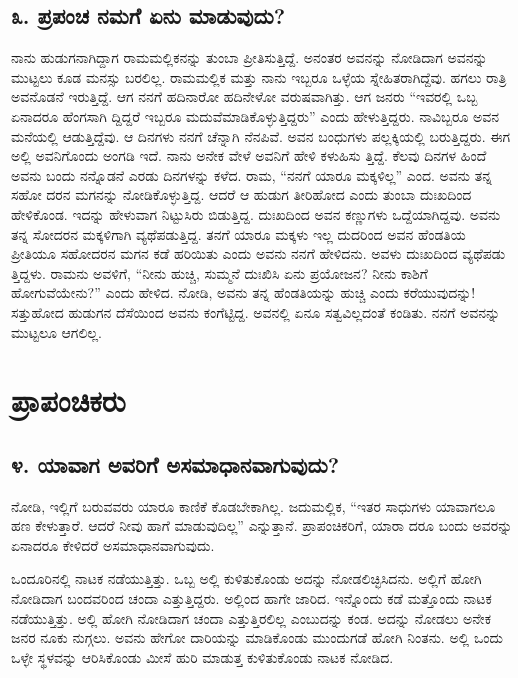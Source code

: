 \section{\num{೩.} ಪ್ರಪಂಚ ನಮಗೆ ಏನು ಮಾಡುವುದು?}

ನಾನು ಹುಡುಗನಾಗಿದ್ದಾಗ ರಾಮಮಲ್ಲಿಕನನ್ನು ತುಂಬಾ ಪ್ರೀತಿಸುತ್ತಿದ್ದೆ. ಅನಂತರ ಅವನನ್ನು ನೋಡಿದಾಗ ಅವನನ್ನು ಮುಟ್ಟಲು ಕೂಡ ಮನಸ್ಸು ಬರಲಿಲ್ಲ. ರಾಮಮಲ್ಲಿಕ ಮತ್ತು ನಾನು ಇಬ್ಬರೂ ಒಳ್ಳೆಯ ಸ್ನೇಹಿತರಾಗಿದ್ದೆವು. ಹಗಲು ರಾತ್ರಿ ಅವನೊಡನೆ ಇರುತ್ತಿದ್ದೆ. ಆಗ ನನಗೆ ಹದಿನಾರೋ ಹದಿನೇಳೋ ವರುಷವಾಗಿತ್ತು. ಆಗ ಜನರು “ಇವರಲ್ಲಿ ಒಬ್ಬ ಏನಾದರೂ ಹೆಂಗಸಾಗಿ ದ್ದಿದ್ದರೆ ಇಬ್ಬರೂ ಮದುವೆಮಾಡಿಕೊಳ್ಳುತ್ತಿದ್ದರು” ಎಂದು ಹೇಳುತ್ತಿದ್ದರು. ನಾವಿಬ್ಬರೂ ಅವನ ಮನೆಯಲ್ಲಿ ಆಡುತ್ತಿದ್ದೆವು. ಆ ದಿನಗಳು ನನಗೆ ಚೆನ್ನಾಗಿ ನೆನಪಿವೆ. ಅವನ ಬಂಧುಗಳು ಪಲ್ಲಕ್ಕಿಯಲ್ಲಿ ಬರುತ್ತಿದ್ದರು. ಈಗ ಅಲ್ಲಿ ಅವನಿಗೊಂದು ಅಂಗಡಿ ಇದೆ. ನಾನು ಅನೇಕ ವೇಳೆ ಅವನಿಗೆ ಹೇಳಿ ಕಳುಹಿಸು ತ್ತಿದ್ದೆ. ಕೆಲವು ದಿನಗಳ ಹಿಂದೆ ಅವನು ಬಂದು ನನ್ನೊಡನೆ ಎರಡು ದಿನಗಳನ್ನು ಕಳೆದ. ರಾಮ, “ನನಗೆ ಯಾರೂ ಮಕ್ಕಳಿಲ್ಲ” ಎಂದ. ಅವನು ತನ್ನ ಸಹೋ ದರನ ಮಗನನ್ನು ನೋಡಿಕೊಳ್ಳುತ್ತಿದ್ದ. ಆದರೆ ಆ ಹುಡುಗ ತೀರಿಹೋದ ಎಂದು ತುಂಬಾ ದುಃಖದಿಂದ ಹೇಳಿಕೊಂಡ. ಇದನ್ನು ಹೇಳುವಾಗ ನಿಟ್ಟುಸಿರು ಬಿಡುತ್ತಿದ್ದ. ದುಃಖದಿಂದ ಅವನ ಕಣ್ಣುಗಳು ಒದ್ದೆಯಾಗಿದ್ದವು. ಅವನು ತನ್ನ ಸೋದರನ ಮಕ್ಕಳಿಗಾಗಿ ವ್ಯಥೆಪಡುತ್ತಿದ್ದ. ತನಗೆ ಯಾರೂ ಮಕ್ಕಳು ಇಲ್ಲ ದುದರಿಂದ ಅವನ ಹೆಂಡತಿಯ ಪ್ರೀತಿಯೂ ಸಹೋದರನ ಮಗನ ಕಡೆ ಹರಿಯಿತು ಎಂದು ಅವನು ನನಗೆ ಹೇಳಿದನು. ಅವಳು ದುಃಖದಿಂದ ವ್ಯಥೆಪಡು ತ್ತಿದ್ದಳು. ರಾಮನು ಅವಳಿಗೆ, “ನೀನು ಹುಚ್ಚಿ, ಸುಮ್ಮನೆ ದುಃಖಿಸಿ ಏನು ಪ್ರಯೋಜನ? ನೀನು ಕಾಶಿಗೆ ಹೋಗುವೆಯೇನು?” ಎಂದು ಹೇಳಿದ. ನೋಡಿ, ಅವನು ತನ್ನ ಹೆಂಡತಿಯನ್ನು ಹುಚ್ಚಿ ಎಂದು ಕರೆಯುವುದನ್ನು! ಸತ್ತುಹೋದ ಹುಡುಗನ ದೆಸೆಯಿಂದ ಅವನು ಕಂಗೆಟ್ಟಿದ್ದ. ಅವನಲ್ಲಿ ಏನೂ ಸತ್ವವಿಲ್ಲದಂತೆ ಕಂಡಿತು. ನನಗೆ ಅವನನ್ನು ಮುಟ್ಟಲೂ ಆಗಲಿಲ್ಲ.

\chapter{ಪ್ರಾಪಂಚಿಕರು}

\section{\num{೪.} ಯಾವಾಗ ಅವರಿಗೆ ಅಸಮಾಧಾನವಾಗುವುದು?}

ನೋಡಿ, ಇಲ್ಲಿಗೆ ಬರುವವರು ಯಾರೂ ಕಾಣಿಕೆ ಕೊಡಬೇಕಾಗಿಲ್ಲ. ಜದುಮಲ್ಲಿಕ, “ಇತರ ಸಾಧುಗಳು ಯಾವಾಗಲೂ ಹಣ ಕೇಳುತ್ತಾರೆ. ಆದರೆ ನೀವು ಹಾಗೆ ಮಾಡುವುದಿಲ್ಲ” ಎನ್ನುತ್ತಾನೆ. ಪ್ರಾಪಂಚಿಕರಿಗೆ, ಯಾರಾ ದರೂ ಬಂದು ಅವರನ್ನು ಏನಾದರೂ ಕೇಳಿದರೆ ಅಸಮಾಧಾನವಾಗುವುದು.

ಒಂದೂರಿನಲ್ಲಿ ನಾಟಕ ನಡೆಯುತ್ತಿತ್ತು. ಒಬ್ಬ ಅಲ್ಲಿ ಕುಳಿತುಕೊಂಡು ಅದನ್ನು ನೋಡಲಿಚ್ಛಿಸಿದನು. ಅಲ್ಲಿಗೆ ಹೋಗಿ ನೋಡಿದಾಗ ಬಂದವರಿಂದ ಚಂದಾ ಎತ್ತುತ್ತಿದ್ದರು. ಅಲ್ಲಿಂದ ಹಾಗೇ ಜಾರಿದ. ಇನ್ನೊಂದು ಕಡೆ ಮತ್ತೊಂದು ನಾಟಕ ನಡೆಯುತ್ತಿತ್ತು. ಅಲ್ಲಿ ಹೋಗಿ ನೋಡಿದಾಗ ಚಂದಾ ಎತ್ತುತ್ತಿರಲಿಲ್ಲ ಎಂಬುದನ್ನು ಕಂಡ. ಅದನ್ನು ನೋಡಲು ಅನೇಕ ಜನರ ನೂಕು ನುಗ್ಗಲು. ಅವನು ಹೇಗೋ ದಾರಿಯನ್ನು ಮಾಡಿಕೊಂಡು ಮುಂದುಗಡೆ ಹೋಗಿ ನಿಂತನು. ಅಲ್ಲಿ ಒಂದು ಒಳ್ಳೇ ಸ್ಥಳವನ್ನು ಆರಿಸಿಕೊಂಡು ಮೀಸೆ ಹುರಿ ಮಾಡುತ್ತ ಕುಳಿತುಕೊಂಡು ನಾಟಕ ನೋಡಿದ.


